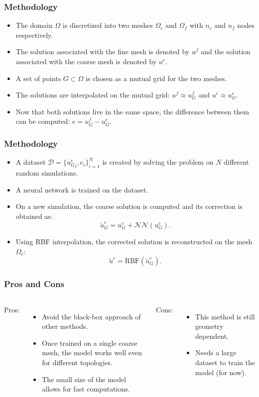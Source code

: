 \documentclass{beamer}
\begin{document}
\begin{frame}
\frametitle{Methodology}
\begin{itemize}
    \item The domain \( \Omega \) is discretized into two meshes \( \Omega_c \) and \( \Omega_f \) with \( n_c \) and \( n_f \) nodes respectively. 
    \item The solution associated with the fine mesh is denoted by \( u^f \) and the solution associated with the coarse mesh is denoted by \( u^c \).
    \item A set of points \(G \subset \Omega\) is chosen as a mutual grid for the two meshes.
    \item The solutions are interpolated on the mutual grid: \( u^f \approx u^f_G \) and \( u^c \approx u^c_G \).
    \item Now that both solutions live in the same space, the difference between them can be computed: \( e = u^f_G - u^c_G \).
\end{itemize}
\end{frame}

\begin{frame}
\frametitle{Methodology}
\begin{itemize}
    \item A dataset \(\mathcal{D} = \{{u_G^c}_i, e_i\}_{i=1}^N\) is created by solving the problem on \(N\) different random simulations.
    \item A neural network is trained on the dataset.
    \item On a new simulation, the coarse solution is computed and its correction is obtained as: 
    \[
        \tilde{u}_G^c = u_G^c + \mathcal{NN}(u_G^c).
    \]
    \item Using RBF interpolation, the corrected solution is reconstructed on the mesh \( \Omega_c \):
    \[
        \tilde{u}^c = \text{RBF}(\tilde{u}_G^c).
    \]
\end{itemize}
\end{frame}

\begin{frame}
\frametitle{Pros and Cons}
\begin{columns}
    Pros:
    \begin{itemize}
        \item Avoid the black-box approach of other methods.
        \item Once trained on a single coarse mesh, the model works well even for different topologies.
        \item The small size of the model allows for fast computations.
    \end{itemize}
    Cons:
    \begin{itemize}
        \item This method is still geometry dependent.
        \item Needs a large dataset to train the model (for now).
    \end{itemize}
\end{columns}
\end{frame}
\end{document}

